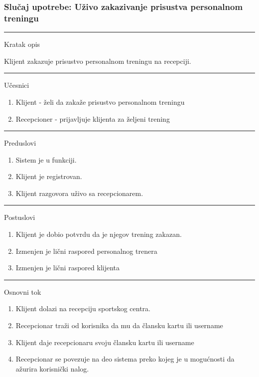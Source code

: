 \subsubsection{Slučaj upotrebe: Uživo zakazivanje prisustva personalnom treningu}

\begin{center}
\vspace{0.2cm}
\hrule
\vspace{0.2cm}
    \begin{center}
    Kratak opis  
    \end{center}
    Klijent zakazuje prisustvo personalnom treningu na recepciji. \vspace{0.2cm}\\ 
\hrule
\vspace{0.2cm}
    Učesnici
    \begin{enumerate}
    \item Klijent - želi da zakaže prisustvo personalnom treningu
    \item Recepcioner - prijavljuje klijenta za željeni trening
   \end{enumerate}
\hrule
\vspace{0.2cm}
   Preduslovi \begin{enumerate}
    \item Sistem je u funkciji.
    \item Klijent je registrovan.
    \item Klijent razgovora uživo sa recepcionarem.
   \end{enumerate}
\hrule 
\vspace{0.2cm}
    Postuslovi
    \begin{enumerate}
    \item Klijent je dobio potvrdu da je njegov trening zakazan.
    \item Izmenjen je lični raspored personalnog trenera
    \item Izmenjen je lični raspored klijenta
   \end{enumerate}
\hrule
\vspace{0.2cm}
    Osnovni tok
    \begin{enumerate}
    \item Klijent dolazi na recepciju sportskog centra.
    \item Recepcionar traži od korisnika da mu da člansku kartu ili username
    \item Klijent daje recepcionaru svoju člansku kartu ili username
    \item Recepcionar se povezuje na deo sistema preko kojeg je u mogućnosti da ažurira korisnički nalog.

\end{enumerate}
\end{center}
